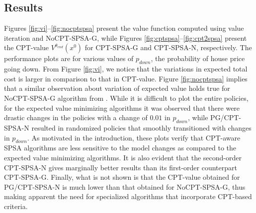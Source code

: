 \documentclass[11pt,letterpaper,english]{article}
\begin{document}
\subsection{Results} Figures \ref{fig:vi}--\ref{fig:nocptspsa} present the value function computed using value iteration and NoCPT-SPSA-G, while Figures \ref{fig:cptspsa}--\ref{fig:cpt2spsa} present the CPT-value $V^{\theta_{end}}(x^0)$ for CPT-SPSA-G and CPT-SPSA-N, respectively. The performance plots are for various values of $p_{down}$, the probability of house price going down. 
From Figure \ref{fig:vi}, we notice that the variations in expected total cost is larger in comparison to that in CPT-value. Figure \ref{fig:nocptspsa} implies that a similar observation about variation of expected value holds true for NoCPT-SPSA-G algorithm from \cite{bhatnagar2004simultaneous}. While it is difficult to plot the entire policies, for the expected value minimizing algorithms it was observed that there were drastic changes in the policies with a change of $0.01$ in $p_{down}$, while PG/CPT-SPSA-N resulted in randomized policies that smoothly transitioned with changes in $p_{down}$.
As motivated in the introduction, these plots verify that CPT-aware SPSA algorithms are less sensitive to the model changes as compared to the expected value minimizing algorithms. It is also evident that the second-order CPT-SPSA-N gives marginally better results than its first-order counterpart CPT-SPSA-G.
 Finally, what is not shown is that the CPT-value obtained for PG/CPT-SPSA-N is much lower than that obtained for NoCPT-SPSA-G, thus making apparent the need for specialized algorithms that incorporate CPT-based criteria.




\end{document}
